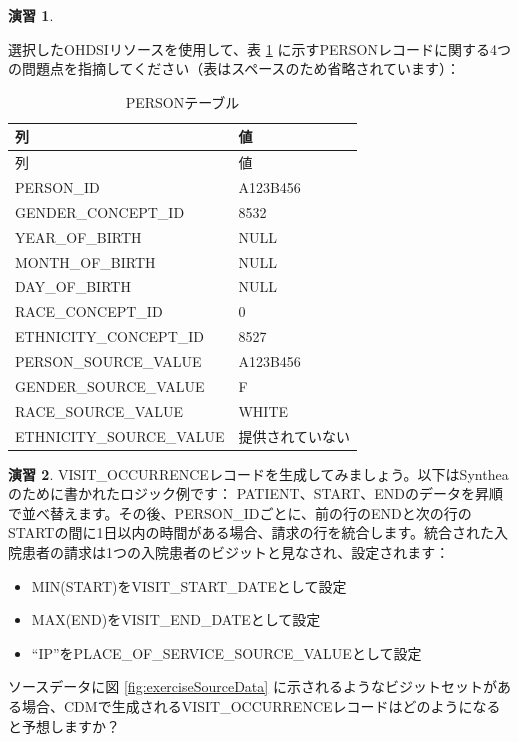 \documentclass[
  11pt]{book}
\providecommand{\tightlist}{%
  \setlength{\itemsep}{0pt}\setlength{\parskip}{0pt}}
\theoremstyle{definition}
\theoremstyle{definition}
\theoremstyle{definition}
\newtheorem{exercise}{演習}[chapter]
\theoremstyle{definition}
\theoremstyle{remark}
\begin{document}
\begin{exercise}
\protect\hypertarget{exr:exerciseEtl2}{}\label{exr:exerciseEtl2}

選択したOHDSIリソースを使用して、表 \ref{tab:exercisePersonTable} に示すPERSONレコードに関する4つの問題点を指摘してください（表はスペースのため省略されています）：

\begin{longtable}[]{@{}ll@{}}
\caption{\label{tab:exercisePersonTable} PERSONテーブル}\tabularnewline
\toprule\noalign{}
列 & 値 \\
\midrule\noalign{}
\endfirsthead
\toprule\noalign{}
列 & 値 \\
\midrule\noalign{}
\endhead
\bottomrule\noalign{}
\endlastfoot
PERSON\_ID & A123B456 \\
GENDER\_CONCEPT\_ID & 8532 \\
YEAR\_OF\_BIRTH & NULL \\
MONTH\_OF\_BIRTH & NULL \\
DAY\_OF\_BIRTH & NULL \\
RACE\_CONCEPT\_ID & 0 \\
ETHNICITY\_CONCEPT\_ID & 8527 \\
PERSON\_SOURCE\_VALUE & A123B456 \\
GENDER\_SOURCE\_VALUE & F \\
RACE\_SOURCE\_VALUE & WHITE \\
ETHNICITY\_SOURCE\_VALUE & 提供されていない \\
\end{longtable}

\end{exercise}

\begin{exercise}
\protect\hypertarget{exr:exerciseEtl3}{}\label{exr:exerciseEtl3}VISIT\_OCCURRENCEレコードを生成してみましょう。以下はSyntheaのために書かれたロジック例です：
PATIENT、START、ENDのデータを昇順で並べ替えます。その後、PERSON\_IDごとに、前の行のENDと次の行のSTARTの間に1日以内の時間がある場合、請求の行を統合します。統合された入院患者の請求は1つの入院患者のビジットと見なされ、設定されます：

\begin{itemize}
\tightlist
\item
  MIN(START)をVISIT\_START\_DATEとして設定
\item
  MAX(END)をVISIT\_END\_DATEとして設定
\item
  ``IP''をPLACE\_OF\_SERVICE\_SOURCE\_VALUEとして設定
\end{itemize}

ソースデータに図 \ref{fig:exerciseSourceData} に示されるようなビジットセットがある場合、CDMで生成されるVISIT\_OCCURRENCEレコードはどのようになると予想しますか？
\end{exercise}
\end{document}
